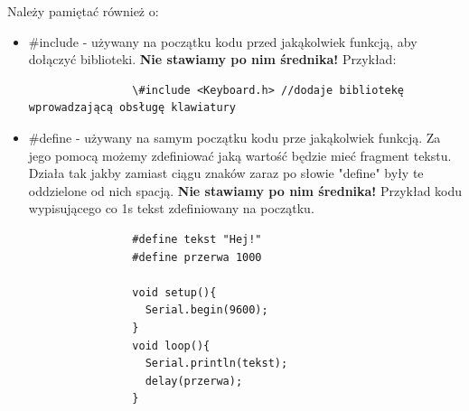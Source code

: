	Należy pamiętać również o:
	\begin{itemize}
		\item \#include - używany na początku kodu przed jakąkolwiek funkcją, aby dołączyć biblioteki. \textbf{Nie stawiamy po nim średnika!} Przykład:
			\begin{verbatim}
				\#include <Keyboard.h> //dodaje bibliotekę wprowadzającą obsługę klawiatury
			\end{verbatim}
		\item \#define - używany na samym początku kodu prze jakąkolwiek funkcją. Za jego pomocą możemy zdefiniować jaką wartość będzie mieć fragment tekstu.
		Działa tak jakby zamiast ciągu znaków zaraz po słowie "define" były te oddzielone od nich spacją. \textbf{Nie stawiamy po nim średnika!} Przykład kodu wypisującego co 1s tekst zdefiniowany na początku.
			\begin{verbatim}
				#define tekst "Hej!"
				#define przerwa 1000
				
				void setup(){
				  Serial.begin(9600);
				}
				void loop(){
				  Serial.println(tekst);
				  delay(przerwa);
				}
			\end{verbatim}
	\end{itemize}
